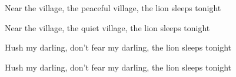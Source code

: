\begin{song}
\bigskip

Near the village, the peaceful village, the lion sleeps tonight \par
{}Near the village, the quiet village, the lion sleeps tonight \par

\bigskip

\Chorus \par

\bigskip

Hush my darling, don’t fear my darling, the lion sleeps tonight \par
{}Hush my darling, don’t fear my darling, the lion sleeps tonight \par

\bigskip

\Chorus \par
{} \par

\end{song}
